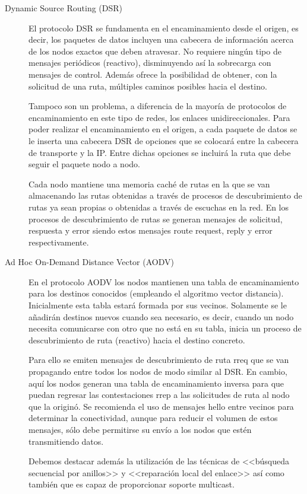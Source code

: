 \begin{description}
\item[Dynamic Source Routing (DSR)]
El protocolo DSR se fundamenta en el encaminamiento desde el origen, es decir, los paquetes de datos incluyen una cabecera de informaci\'on acerca de los nodos exactos que deben atravesar. No requiere ning\'un tipo de mensajes peri\'odicos (reactivo), disminuyendo as\'i la sobrecarga con mensajes de control. Adem\'as ofrece la posibilidad de obtener, con la solicitud de una ruta, m\'ultiples caminos posibles hacia el destino.

 Tampoco son un problema, a diferencia de la mayor\'ia de protocolos de encaminamiento en este tipo de redes, los enlaces unidireccionales. Para poder realizar el encaminamiento en el origen, a cada paquete de datos se le inserta una cabecera DSR de opciones que se colocar\'a entre la cabecera de transporte y la IP. Entre dichas opciones se incluir\'a la ruta que debe seguir el paquete nodo a nodo. 
 
 Cada nodo mantiene una memoria cach\'e de rutas en la que se van almacenando las rutas obtenidas a trav\'es de procesos de descubrimiento de rutas ya sean propias o obtenidas a trav\'es de escuchas en la red. En los procesos de descubrimiento de rutas se generan mensajes de solicitud, respuesta y error siendo estos mensajes route request, reply y error respectivamente. 

\item[Ad Hoc On-Demand Distance Vector (AODV)]
En el protocolo AODV los nodos mantienen una tabla de encaminamiento para los destinos conocidos (empleando el algoritmo vector distancia). Inicialmente esta tabla estar\'a formada por sus vecinos. Solamente se le a\~nadir\'an destinos nuevos cuando sea necesario, es decir, cuando un nodo necesita comunicarse con otro que no est\'a en su tabla, inicia un proceso de descubrimiento de ruta (reactivo) hacia el destino concreto.

Para ello se emiten mensajes de descubrimiento de ruta rreq que se van propagando entre todos los nodos de modo similar al DSR. En cambio, aqu\'i los nodos generan una tabla de encaminamiento inversa para que puedan regresar las contestaciones rrep a las solicitudes de ruta al nodo que la origin\'o. Se recomienda el uso de mensajes hello entre vecinos para determinar la conectividad, aunque para reducir el volumen de estos mensajes, s\'olo debe permitirse su env\'io a los nodos que est\'en transmitiendo datos. 

Debemos destacar adem\'as la utilizaci\'on de las t\'ecnicas de <<b\'usqueda secuencial por anillos>> y <<reparaci\'on local del enlace>> as\'i como tambi\'en que es capaz de proporcionar soporte multicast.
\end{description}

